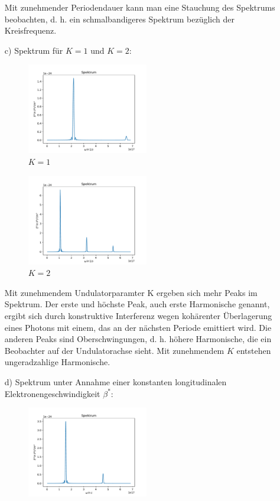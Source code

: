 \documentclass[11pt,a4paper]{article}
\begin{document}
\begin{itemize}
			Mit zunehmender Periodendauer kann man eine Stauchung des Spektrums beobachten, d. h. ein schmalbandigeres Spektrum 
			bezüglich der Kreisfrequenz.

			\item[c)] Spektrum für $K = 1$ und $K = 2$:
			\begin{figure}[H]
				\centering
				\includegraphics[width=0.5\textwidth]{build/spektrum_K1.0_Perioden20_neu.pdf}
				\caption{$K=1$}
			\end{figure}

			\begin{figure}[H]
				\centering
				\includegraphics[width=0.5\textwidth]{build/spektrum_K2.0_Perioden20_neu.pdf}
				\caption{$K=2$}
			\end{figure}

			Mit zunehmendem Undulatorparamter K ergeben sich mehr Peaks im Spektrum. Der erste und höchste Peak, auch erste Harmonische genannt, ergibt sich durch konstruktive Interferenz 
			wegen kohärenter Überlagerung eines Photons mit einem, das an der nächsten Periode emittiert wird. Die anderen Peaks sind Oberschwingungen, d. h. höhere Harmonische, die ein
			Beobachter auf der Undulatorachse sieht. Mit zunehmendem $K$ entstehen ungeradzahlige Harmonische.
		

			\item[d)] Spektrum unter Annahme einer konstanten longitudinalen Elektronengeschwindigkeit $\beta^{*}$:

			\begin{figure}[H]
				\centering
				\includegraphics[width=0.5\textwidth]{build/spektrum_K1.5_Perioden20_d.pdf}
			\end{figure}


\end{itemize}
\end{document}
